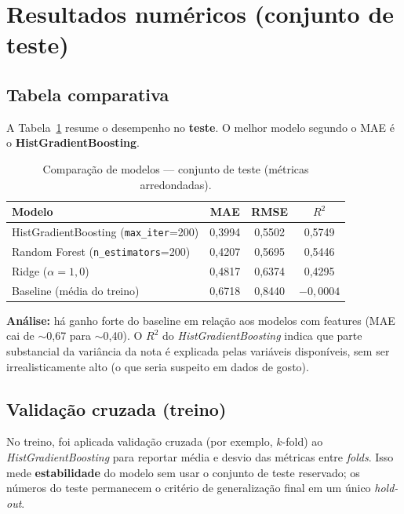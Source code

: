 \documentclass[11pt,a4paper]{article}
\begin{document}
\section{Resultados numéricos (conjunto de teste)}

\subsection{Tabela comparativa}
A Tabela~\ref{tab:comparacao} resume o desempenho no \textbf{teste}. O melhor modelo segundo o MAE é o \textbf{HistGradientBoosting}.

\begin{table}[H]
  \centering
  \caption{Comparação de modelos --- conjunto de teste (métricas arredondadas).}
  \label{tab:comparacao}
  \begin{tabular}{lccc}
    \toprule
    \textbf{Modelo} & \textbf{MAE} & \textbf{RMSE} & \textbf{$R^2$} \\
    \midrule
    HistGradientBoosting (\texttt{max\_iter}=200) & 0{,}3994 & 0{,}5502 & 0{,}5749 \\
    Random Forest (\texttt{n\_estimators}=200)   & 0{,}4207 & 0{,}5695 & 0{,}5446 \\
    Ridge ($\alpha=1{,}0$)                        & 0{,}4817 & 0{,}6374 & 0{,}4295 \\
    Baseline (média do treino)                    & 0{,}6718 & 0{,}8440 & $-0{,}0004$ \\
    \bottomrule
  \end{tabular}
\end{table}

\textbf{Análise:} há ganho forte do baseline em relação aos modelos com features (MAE cai de $\sim$0{,}67 para $\sim$0{,}40). O $R^2$ do \emph{HistGradientBoosting} indica que parte substancial da variância da nota é explicada pelas variáveis disponíveis, sem ser irrealisticamente alto (o que seria suspeito em dados de gosto).

\subsection{Validação cruzada (treino)}
No treino, foi aplicada validação cruzada (por exemplo, $k$-fold) ao \emph{HistGradientBoosting} para reportar média e desvio das métricas entre \emph{folds}. Isso mede \textbf{estabilidade} do modelo sem usar o conjunto de teste reservado; os números do teste permanecem o critério de generalização final em um único \emph{hold-out}.
\end{document}
